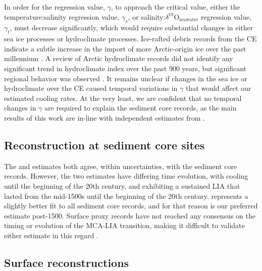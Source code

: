 \documentclass[draft]{agujournal2019}
\begin{document}
In order for the regression value, $\gamma$,
to approach the critical
value, either the temperature:salinity
regression value, $\gamma_{s}$, or salinity:$\delta^{18}\mathrm{O}_{\mathrm{seawater}}$ regression
value, $\gamma_{t}$, must decrease significantly, which
would require substantial changes in either sea ice processes or
hydroclimate processes. Ice-rafted debris records from the CE
indicate a subtle increase in the import of more Arctic-origin ice
over the past millennium
\cite[]{Alonso-Garcia-Kleiven-2017:Freshening}. A review of Arctic
hydroclimate records did not identify any significant trend in
hydroclimate index over the past 900 years, but significant regional
behavior was observed \cite[]{Linderholm-Nicolle-2018:Arctic}. It
remains unclear if changes in the sea ice or hydroclimate over the CE
caused temporal variations in
$\gamma$ that would affect our estimated cooling rates. At the very least,
we are confident that no temporal changes in $\gamma$ are required to explain
the sediment core records, as the main results of this work are in-line with
independent estimates from .

\subsection{Reconstruction at sediment core sites}

The  and  estimates both agree, within
uncertainties, with the sediment core records. However, the two
estimates have differing time evolution, with  cooling
until the beginning of the 20th century, and 
exhibiting a sustained LIA that lasted from the mid-1500s until the
beginning of the 20th century.  represents a slightly
better fit to all sediment core records, and for that reason is our
preferred estimate post-1500. Surface proxy records have not reached
any consensus on the timing or evolution of the MCA-LIA transition,
making it difficult to validate either estimate in this regard
\cite[]{MoffaSanchez:Variability}.

\subsection{Surface reconstructions \label{sec:surfreconres}}
\end{document}

